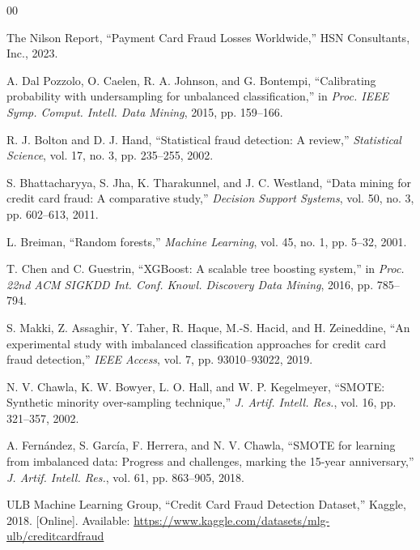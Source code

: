\documentclass[conference]{IEEEtran}
\begin{document}
\begin{thebibliography}{00}

The Nilson Report, ``Payment Card Fraud Losses Worldwide,'' HSN Consultants, Inc., 2023.

A. Dal Pozzolo, O. Caelen, R. A. Johnson, and G. Bontempi, ``Calibrating probability with undersampling for unbalanced classification,'' in \textit{Proc. IEEE Symp. Comput. Intell. Data Mining}, 2015, pp. 159--166.

R. J. Bolton and D. J. Hand, ``Statistical fraud detection: A review,'' \textit{Statistical Science}, vol. 17, no. 3, pp. 235--255, 2002.

S. Bhattacharyya, S. Jha, K. Tharakunnel, and J. C. Westland, ``Data mining for credit card fraud: A comparative study,'' \textit{Decision Support Systems}, vol. 50, no. 3, pp. 602--613, 2011.

L. Breiman, ``Random forests,'' \textit{Machine Learning}, vol. 45, no. 1, pp. 5--32, 2001.

T. Chen and C. Guestrin, ``XGBoost: A scalable tree boosting system,'' in \textit{Proc. 22nd ACM SIGKDD Int. Conf. Knowl. Discovery Data Mining}, 2016, pp. 785--794.

S. Makki, Z. Assaghir, Y. Taher, R. Haque, M.-S. Hacid, and H. Zeineddine, ``An experimental study with imbalanced classification approaches for credit card fraud detection,'' \textit{IEEE Access}, vol. 7, pp. 93010--93022, 2019.

N. V. Chawla, K. W. Bowyer, L. O. Hall, and W. P. Kegelmeyer, ``SMOTE: Synthetic minority over-sampling technique,'' \textit{J. Artif. Intell. Res.}, vol. 16, pp. 321--357, 2002.

A. Fernández, S. García, F. Herrera, and N. V. Chawla, ``SMOTE for learning from imbalanced data: Progress and challenges, marking the 15-year anniversary,'' \textit{J. Artif. Intell. Res.}, vol. 61, pp. 863--905, 2018.

ULB Machine Learning Group, ``Credit Card Fraud Detection Dataset,'' Kaggle, 2018. [Online]. Available: \url{https://www.kaggle.com/datasets/mlg-ulb/creditcardfraud}

\end{thebibliography}
\end{document}
